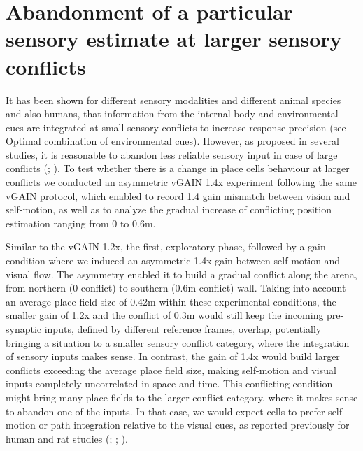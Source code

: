 \section{Abandonment of a particular sensory estimate at larger sensory conflicts}
\label{sec:gain_12}

It has been shown for different sensory modalities and different animal species and also humans, that information from the internal body and environmental cues are integrated at small sensory conflicts to increase response precision (see Optimal combination of environmental cues). However, as proposed in several studies, it is reasonable to abandon less reliable sensory input in case of large conflicts  (\cite{Sjolund2018}; \cite{Cheng2007}). To test whether there is a change in place cells behaviour at larger conflicts we conducted an asymmetric vGAIN 1.4x experiment following the same vGAIN protocol, which enabled to record 1.4 gain mismatch between vision and self-motion, as well as to analyze the gradual increase of conflicting position estimation ranging from 0 to 0.6m.

Similar to the vGAIN 1.2x, the first, exploratory phase, followed by a gain condition where we induced an asymmetric 1.4x gain between self-motion and visual flow. The asymmetry enabled it to build a gradual conflict along the arena, from northern (0 conflict) to southern (0.6m conflict) wall. Taking into account an average place field size of 0.42m within these experimental conditions, the smaller gain of 1.2x and the conflict of 0.3m would still keep the incoming pre-synaptic inputs, defined by different reference frames, overlap, potentially bringing a situation to a smaller sensory conflict category, where the integration of sensory inputs makes sense. In contrast, the gain of 1.4x would build larger conflicts exceeding the average place field size, making self-motion and visual inputs completely uncorrelated in space and time. This conflicting condition might bring many place fields to the larger conflict category, where it makes sense to abandon one of the inputs. In that case, we would expect cells to prefer self-motion or path integration relative to the visual cues, as reported previously for human and rat studies (\cite{Sjolund2018}; \cite{Zhao2015}; \cite{Shettleworth2005}).

